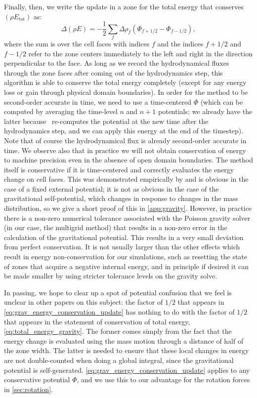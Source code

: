 \documentclass[12pt]{article}
\begin{document}
Finally, then, we write the update in a zone for the total energy that conserves $(\rho E_{\text{tot}})$ as:
\begin{equation}
  \Delta (\rho E) = -\frac{1}{2}\sum_{f} \Delta \rho_{f} (\Phi_{f+1/2} - \Phi_{f-1/2}),\label{eq:grav_energy_conservation_update}
\end{equation}
where the sum is over the cell faces with indices $f$ and the indices $f+1/2$ and $f-1/2$ refer to
the zone centers immediately to the left and right in the direction perpendicular to the face.
As long as we record the hydrodynamical fluxes through the zone faces after coming out of the hydrodynamics step,
this algorithm is able to conserve the total energy completely (except for any energy loss or gain through
physical domain boundaries). In order for the method to be second-order accurate in time,
we need to use a time-centered $\Phi$ (which can be computed by averaging the time-level $n$ and $n+1$ potentials;
we already have the latter because \castro\ re-computes the potential at the new time after the hydrodynamics step,
and we can apply this energy at the end of the timestep). Note that of course the hydrodynamical
flux is already second-order accurate in time. We observe also that in practice we will not obtain
conservation of energy to machine precision even in the absence of open domain boundaries. The
method itself is conservative if it is time-centered and correctly evaluates the energy change
on cell faces. This was demonstrated empirically by \cite{jiang:2013} and is obvious in the case of a
fixed external potential; it is not as obvious in the case of the gravitational self-potential, which
changes in response to changes in the mass distribution, so we give a short proof of this in
\autoref{app:gravity}. However, in practice there is a non-zero numerical tolerance associated
with the Poisson gravity solver (in our case, the multigrid method) that results in a non-zero error
in the calculation of the gravitational potential. This results in a very small deviation from perfect
conservation. It is not usually larger than the other effects which result in energy non-conservation
for our simulations, such as resetting the state of zones that acquire a negative internal energy, and
in principle if desired it can be made smaller by using stricter tolerance levels on the gravity solve.

In passing, we hope to clear up a spot of potential confusion that we feel is unclear in other papers
on this subject: the factor of $1/2$ that appears in \autoref{eq:grav_energy_conservation_update}
has nothing to do with the factor of $1/2$ that appears in the statement of conservation of total energy,
\autoref{eq:total_energy_gravity}. The former comes simply from the fact that the energy change is
evaluated using the mass motion through a distance of half of the zone width. The latter is needed
to ensure that these local changes in energy are not double-counted when doing a global integral,
since the gravitational potential is self-generated. \autoref{eq:grav_energy_conservation_update}
applies to any conservative potential $\Phi$, and we use this to our advantage for the
rotation forces in \autoref{sec:rotation}.
\end{document}
